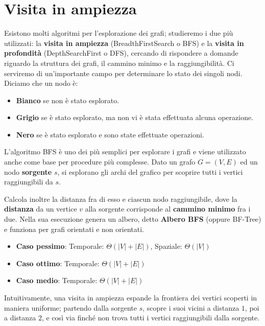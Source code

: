 %

\section{Visita in ampiezza}
Esistono molti algoritmi per l'esplorazione dei grafi; studieremo i due più utilizzati: la \textbf{visita in ampiezza} (BreadthFirstSearch o BFS) e la \textbf{visita in profondità} (DepthSearchFirst o DFS), cercando di rispondere a domande riguardo la struttura dei grafi, il cammino minimo e la raggiungibilità. Ci serviremo di un'importante campo per determinare lo stato dei singoli nodi. Diciamo che un nodo è: \begin{itemize}
	\item \textbf{Bianco} se non è stato esplorato.
	\item \textbf{Grigio} se è stato esplorato, ma non vi è stata effettuata alcuna operazione.
	\item \textbf{Nero} se è stato esplorato e sono state effettuate operazioni.
\end{itemize}
\noindent L'algoritmo BFS è uno dei più semplici per esplorare i grafi e viene utilizzato anche come base per procedure più complesse. Dato un grafo $G=(V,E)$ ed un nodo \textbf{sorgente} $s$, si esplorano gli archi del grafico per scoprire tutti i vertici raggiungibili da $s$.\par
Calcola inoltre la distanza fra di esso e ciascun nodo raggiungibile, dove la \textbf{distanza} da un vertice $v$ alla sorgente corrisponde al \textbf{cammino minimo} fra i due. Nella sua esecuzione genera un albero, detto \textbf{Albero BFS} (oppure BF-Tree) e funziona per grafi orientati e non orientati.
\begin{itemize}
	\item \textbf{Caso pessimo}: Temporale: $\Theta(|V|+|E|)$, Spaziale: $\Theta(|V|)$
	\item \textbf{Caso ottimo}: Temporale: $\Theta(|V|+|E|)$
	\item \textbf{Caso medio}: Temporale: $\Theta(|V|+|E|)$
\end{itemize}
\noindent Intuitivamente, una visita in ampiezza espande la frontiera dei vertici scoperti in maniera uniforme; partendo dalla sorgente $s$, scopre i suoi vicini a distanza $1$, poi a distanza $2$, e così via finché non trova tutti i vertici raggiungibili dalla sorgente.
